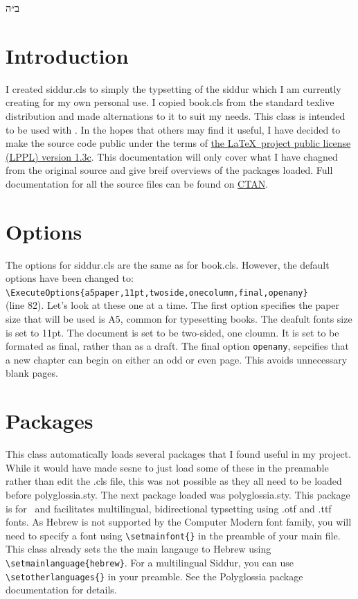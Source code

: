 \documentclass[12pt]{article}
\begin{document}
	\begin{hebrew}\noindent ב״ה\end{hebrew}
	\tableofcontents
	\section{Introduction}
	I created siddur.cls to simply the typsetting of the siddur which I am currently creating for my own personal use. I copied book.cls from the standard texlive distribution and made alternations to it to suit my needs. This class is intended to be used with \XeLaTeX. In the hopes that others may find it useful, I have decided to make the source code public under the terms of \href{https://www.latex-project.org/lppl.txt}{the \LaTeX\ project public license (LPPL) version 1.3c}. This documentation will only cover what I have chagned from the original source and give breif overviews of the packages loaded. Full documentation for all the source files can be found on \href{https://ctan.org/?lang=en}{CTAN}.
	\section{Options}
	The options for siddur.cls are the same as for book.cls. However, the default options have been changed to:\\\verb|\ExecuteOptions{a5paper,11pt,twoside,onecolumn,final,openany}|\\(line 82). Let's look at these one at a time. The first option specifies the paper size that will be used is A5, common for typesetting books. The deafult fonts size is set to 11pt. The document is set to be two-sided, one cloumn. It is set to be formated as final, rather than as a draft. The final option \verb|openany|, sepcifies that a new chapter can begin on either an odd or even page. This avoids unnecessary blank pages.
	\section{Packages}
	This class automatically loads several packages that I found useful in my project. While it would have made sesne to just load some of these in the preamable rather than edit the .cls file, this was not possible as they all need to be loaded before polyglossia.sty.
	The next package loaded was polyglossia.sty. This package is for \XeLaTeX\ and facilitates multilingual, bidirectional typsetting using .otf and .ttf fonts. As Hebrew is not supported by the Computer Modern font family, you will need to specify a font using \verb|\setmainfont{}| in the preamble of your main file. This class already sets the the main langauge to Hebrew using \verb|\setmainlanguage{hebrew}|. For a multilingual Siddur, you can use \verb|\setotherlanguages{}| in your preamble. See the Polyglossia package documentation for details.
\end{document}
